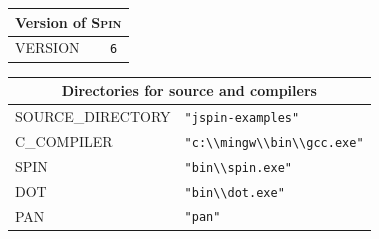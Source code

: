 \documentclass[11pt]{article}
\newcommand{\spn}{\textsc{Spin}}
\begin{document}
\begin{center}

\begin{tabular}{|p{}|p{}|}
\hline
\multicolumn{2}{|c|}{Version of \spn{}}\\ \hline
\textsc{\ttfamily VERSION} &\verb+6+\\\hline
\end{tabular}

\bigskip

\begin{tabular}{|p{}|p{}|}
\hline
\multicolumn{2}{|c|}{Directories for source and compilers}\\ \hline
\textsc{\ttfamily SOURCE\_DIRECTORY} & \verb+"jspin-examples"+ \\
\textsc{\ttfamily C\_COMPILER} &\verb+"c:\\mingw\\bin\\gcc.exe"+ \\
\textsc{\ttfamily SPIN} &\verb+"bin\\spin.exe"+ \\
\textsc{\ttfamily DOT} &\verb+"bin\\dot.exe"+ \\
\textsc{\ttfamily PAN} &\verb+"pan"+ \\ \hline
\end{tabular}

\bigskip


\end{center}
\end{document}
